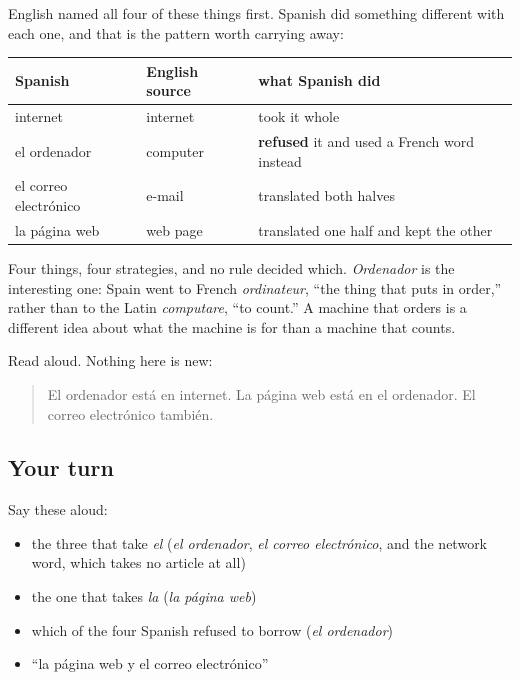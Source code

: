 \begin{grammarlens}[title={Grammar Lens: borrowed, translated, or built}]
English named all four of these things first. Spanish did something different with each one, and that is the pattern worth carrying away:

\noindent
\begin{tabularx}{\linewidth}{@{}>{\raggedright\arraybackslash}X>{\raggedright\arraybackslash}X>{\raggedright\arraybackslash}X@{}}
\toprule
\textbf{Spanish} & \textbf{English source} & \textbf{what Spanish did} \\
\midrule
internet & internet & took it whole \\
el ordenador & computer & \textbf{refused} it and used a French word instead \\
el correo electrónico & e-mail & translated both halves \\
la página web & web page & translated one half and kept the other \\
\bottomrule
\end{tabularx}

Four things, four strategies, and no rule decided which. \emph{Ordenador} is the interesting one: Spain went to French \emph{ordinateur}, \textquotedblleft{}the thing that puts in order,\textquotedblright{} rather than to the Latin \emph{computare}, \textquotedblleft{}to count.\textquotedblright{} A machine that orders is a different idea about what the machine is for than a machine that counts.
\end{grammarlens}

\begin{tcolorbox}[breakable,skin=enhanced,colback=orange!6,colframe=orange!45!black,boxrule=0.5pt,arc=1mm,left=6pt,right=6pt,top=4pt,bottom=4pt,fonttitle=\bfseries,title={Read this}]
Read aloud. Nothing here is new:

\begin{quote}
El ordenador está en internet. La página web está en el ordenador. El correo electrónico también.
\end{quote}
\end{tcolorbox}

\subsection*{Your turn}
Say these aloud:

\begin{itemize}
\raggedright
  \item the three that take \emph{el} (\emph{el ordenador}, \emph{el correo electrónico}, and the network word, which takes no article at all)
  \item the one that takes \emph{la} (\emph{la página web})
  \item which of the four Spanish refused to borrow (\emph{el ordenador})
  \item \textquotedblleft{}la página web y el correo electrónico\textquotedblright{}
\end{itemize}

